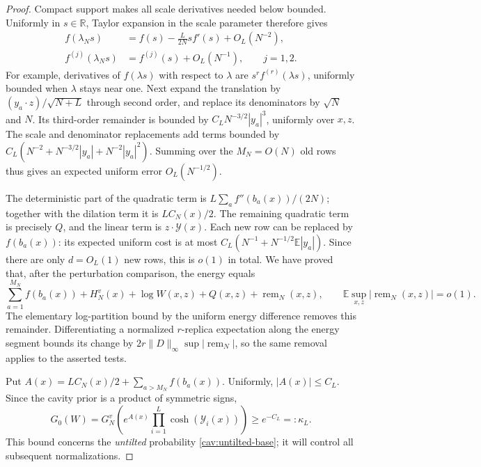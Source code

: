 \begin{proof}
Compact support makes all scale derivatives needed below bounded.
Uniformly in $s\in\mathbb R$, Taylor expansion in the scale parameter
therefore gives
\begin{align*}
 f(\lambda_Ns)&=f(s)-\frac L{2N}s f'(s)+O_L(N^{-2}),\\
 f^{(j)}(\lambda_Ns)&=f^{(j)}(s)+O_L(N^{-1}),\qquad j=1,2.
\end{align*}
For example, derivatives of $f(\lambda s)$ with respect to $\lambda$
are $s^r f^{(r)}(\lambda s)$, uniformly bounded when $\lambda$ stays
near one.  Next expand the translation by
$(y_a\cdot z)/\sqrt{N+L}$ through second order, and replace its
denominators by $\sqrt N$ and $N$.  Its third-order remainder is bounded
by $C_LN^{-3/2}|y_a|^3$, uniformly over $x,z$.  The scale and denominator
replacements add terms bounded by
$C_L(N^{-2}+N^{-3/2}|y_a|+N^{-2}|y_a|^2)$.
Summing over the $M_N=O(N)$ old rows thus gives an expected uniform
error $O_L(N^{-1/2})$.

The deterministic part of the quadratic term is
$L\sum_a f''(b_a(x))/(2N)$; together with the dilation term it is
$LC_N(x)/2$.  The remaining quadratic term is precisely $Q$, and the
linear term is $z\cdot\mathcal Y(x)$.  Each new row can be replaced by
$f(b_a(x))$: its expected uniform cost is at most
$C_L(N^{-1}+N^{-1/2}\mathbb E|y_a|)$.  Since there are only $d=O_L(1)$
new rows, this is $o(1)$ in total.  We have proved that, after the
perturbation comparison, the energy equals
\begin{equation}\label{cav:taylor}
 \sum_{a=1}^{M_N}f(b_a(x))+H_N^v(x)
       +\log W(x,z)+Q(x,z)+\operatorname{rem}_N(x,z),
 \qquad \mathbb E\sup_{x,z}|\operatorname{rem}_N(x,z)|=o(1).
\end{equation}
The elementary log-partition bound by the uniform energy difference
removes this remainder.  Differentiating a normalized $r$-replica
expectation along the energy segment bounds its change by
$2r\|D\|_\infty\sup|\operatorname{rem}_N|$, so the same removal applies
to the asserted tests.

Put $A(x)=LC_N(x)/2+\sum_{a>M_N}f(b_a(x))$.  Uniformly,
$|A(x)|\le C_L$.  Since the cavity prior is a product of symmetric
signs,
\[
 G_0(W)=G_N^v\left(e^{A(x)}
                    \prod_{i=1}^L\cosh(\mathcal Y_i(x))\right)
 \ge e^{-C_L}=:\kappa_L.
\]
This bound concerns the \emph{untilted} probability
\eqref{cav:untilted-base}; it will control all subsequent
normalizations.


\end{proof}
